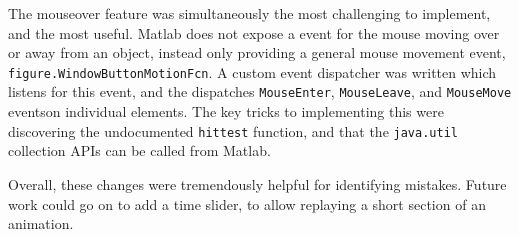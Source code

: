 \documentclass[main.tex]{subfiles}
\begin{document}
The mouseover feature was simultaneously the most challenging to implement, and the most useful.
Matlab does not expose a event for the mouse moving over or away from an object, instead only providing a general mouse movement event, \texttt{figure.WindowButtonMotionFcn}.
A custom event dispatcher was written which listens for this event, and the dispatches \texttt{MouseEnter}, \texttt{MouseLeave}, and \texttt{MouseMove} events\footnotemark on individual elements.
The key tricks to implementing this were discovering the undocumented \texttt{hittest} function\cite{matlab-hittest}, and that the \texttt{java.util} collection APIs can be called from Matlab.


Overall, these changes were tremendously helpful for identifying mistakes.
Future work could go on to add a time slider, to allow replaying a short section of an animation.

\end{document}
